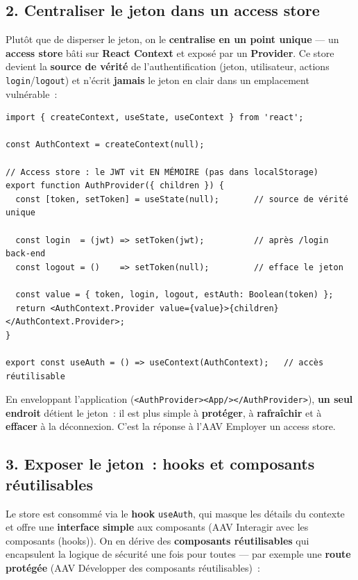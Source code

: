 \vspace{0.4cm}

\subsection*{2. Centraliser le jeton dans un access store}
{}
\noindent Plutôt que de disperser le jeton, on le \textbf{centralise en un point unique} — un \textbf{access store} bâti sur \textbf{React Context} et exposé par un \textbf{Provider}. Ce store devient la \textbf{source de vérité} de l'authentification (jeton, utilisateur, actions \texttt{login}/\texttt{logout}) et n'écrit \textbf{jamais} le jeton en clair dans un emplacement vulnérable~:

\begin{verbatim}
import { createContext, useState, useContext } from 'react';

const AuthContext = createContext(null);

// Access store : le JWT vit EN MÉMOIRE (pas dans localStorage)
export function AuthProvider({ children }) {
  const [token, setToken] = useState(null);       // source de vérité unique

  const login  = (jwt) => setToken(jwt);          // après /login back-end
  const logout = ()    => setToken(null);         // efface le jeton

  const value = { token, login, logout, estAuth: Boolean(token) };
  return <AuthContext.Provider value={value}>{children}</AuthContext.Provider>;
}

export const useAuth = () => useContext(AuthContext);   // accès réutilisable
\end{verbatim}
\noindent En enveloppant l'application (\texttt{<AuthProvider><App/></AuthProvider>}), \textbf{un seul endroit} détient le jeton~: il est plus simple à \textbf{protéger}, à \textbf{rafraîchir} et à \textbf{effacer} à la déconnexion. C'est la réponse à l'AAV \og{}Employer un access store\fg{}.

\newpage

\subsection*{3. Exposer le jeton~: hooks et composants réutilisables}
{}
\noindent Le store est consommé via le \textbf{hook} \texttt{useAuth}, qui masque les détails du contexte et offre une \textbf{interface simple} aux composants (AAV \og{}Interagir avec les composants (hooks)\fg{}). On en dérive des \textbf{composants réutilisables} qui encapsulent la logique de sécurité une fois pour toutes — par exemple une \textbf{route protégée} (AAV \og{}Développer des composants réutilisables\fg{})~:

